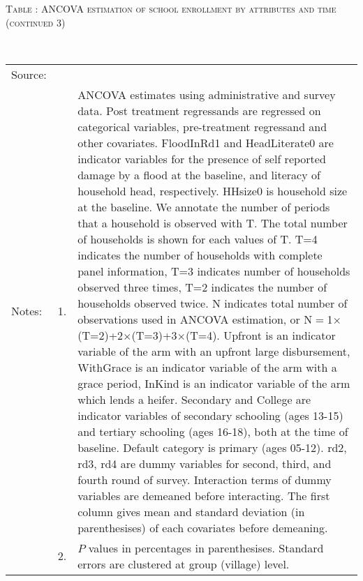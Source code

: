 \hspace{-1cm}\begin{minipage}[t]{14cm}
\hfil\textsc{\normalsize Table \thetable: ANCOVA estimation of school enrollment by attributes and time (continued 3)\label{tab ANCOVA enroll time varying attributes3}}\\
\setlength{\tabcolsep}{1pt}
\setlength{\baselineskip}{8pt}
\renewcommand{\arraystretch}{.525}
\hfil{}\\
\renewcommand{\arraystretch}{.8}
\setlength{\tabcolsep}{1pt}
\hspace{-1cm}\begin{tabular}{>{\hfill\scriptsize}p{1cm}<{}>{\hfill\scriptsize}p{.25cm}<{}>{\scriptsize}p{14cm}<{\hfill}}
Source:& \multicolumn{2}{l}{\scriptsize Estimated with GUK administrative and survey data.}\\
Notes: & 1. & ANCOVA estimates using administrative and survey data. Post treatment regressands are regressed on categorical variables, pre-treatment regressand and other covariates. \textsf{FloodInRd1} and \textsf{HeadLiterate0} are indicator variables for the presence of self reported damage by a flood at the baseline, and literacy of household head, respectively. \textsf{HHsize0} is household size at the baseline. We annotate the number of periods that a household is observed with \textsf{T}. The total number of households is shown for each values of \textsf{T}. \textsf{T=4} indicates the number of households with complete panel information, \textsf{T=3} indicates number of households observed three times, \textsf{T=2} indicates the number of households observed twice. \textsf{N} indicates total number of observations used in ANCOVA estimation, or \textsf{N$=$1$\times$(T=2)+2$\times$(T=3)+3$\times$(T=4)}.  \textsf{Upfront} is an indicator variable of the arm with an upfront large disbursement, \textsf{WithGrace} is an indicator variable of the arm with a grace period, \textsf{InKind} is an indicator variable of the arm which lends a heifer. \textsf{Secondary} and \textsf{College} are indicator variables of secondary schooling (ages 13-15) and tertiary schooling (ages 16-18), both at the time of baseline. Default category is primary (ages 05-12). \textsf{rd2, rd3, rd4} are dummy variables for second, third, and fourth round of survey. Interaction terms of dummy variables are demeaned before interacting. The first column gives mean and standard deviation (in parenthesises) of each covariates before demeaning.\\
& 2. & $P$ values in percentages in parenthesises. Standard errors are clustered at group (village) level.%
\end{tabular}
\end{minipage}


